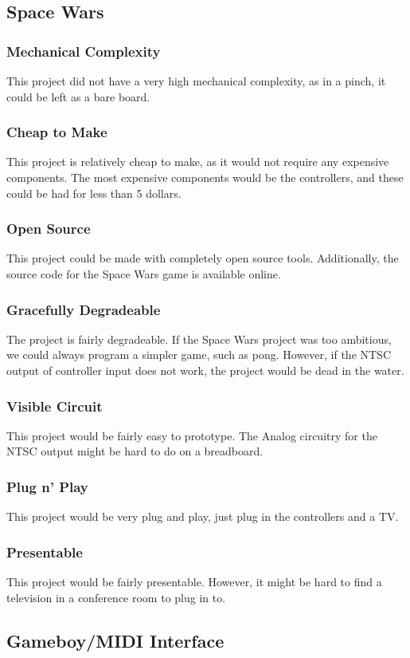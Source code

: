 \documentclass{article}
\begin{document}
\subsection{Space Wars}
\subsubsection {Mechanical Complexity}
This project did not have a very high mechanical complexity, as in a
pinch, it could be left as a bare board. 
\subsubsection{Cheap to Make}
This project is relatively cheap to make, as it would not require any
expensive components. The most expensive components would be the
controllers, and these could be had for less than 5 dollars. 
\subsubsection{Open Source}
This project could be made with completely open source
tools. Additionally, the source code for the Space Wars game is
available online.
\subsubsection{Gracefully Degradeable}
The project is fairly degradeable. If the Space Wars project was too
ambitious, we could always program a simpler game, such as
pong. However, if the NTSC output of controller input does not work,
the project would be dead in the water.
\subsubsection{Visible Circuit}
This project would be fairly easy to prototype. The Analog circuitry
for the NTSC output might be hard to do on a breadboard. 
\subsubsection{Plug n' Play}
This project would be very plug and play, just plug in the controllers and a TV.
\subsubsection{Presentable}
This project would be fairly presentable. However, it might be hard to
find a television in a conference room to plug in to. 

\subsection{Gameboy/MIDI Interface}
\end{document}
